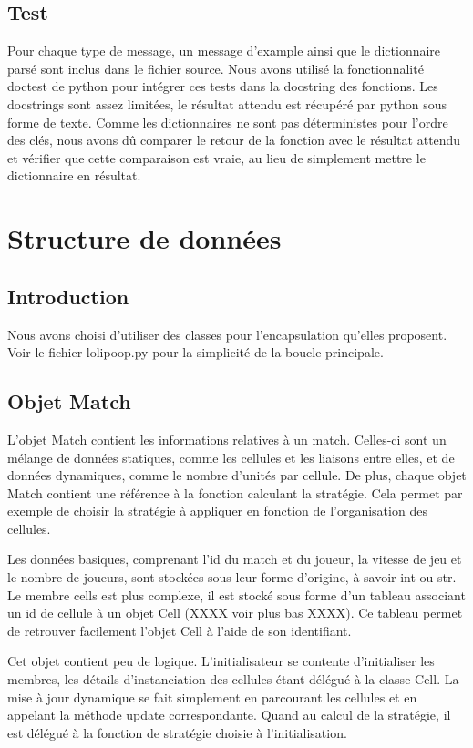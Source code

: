\documentclass{rapport}
\begin{document}
			\subsection{Test}
Pour chaque type de message, un message d'example ainsi que le dictionnaire
parsé sont inclus dans le fichier source. Nous avons utilisé la fonctionnalité
doctest de python pour intégrer ces tests dans la docstring des fonctions. Les
docstrings sont assez limitées, le résultat attendu est récupéré par python sous
forme de texte. Comme les dictionnaires ne sont pas déterministes pour l'ordre
des clés, nous avons dû comparer le retour de la fonction avec le résultat
attendu et vérifier que cette comparaison est vraie, au lieu de simplement
mettre le dictionnaire en résultat.

		\section{Structure de données}
			\subsection{Introduction}
Nous avons choisi d'utiliser des classes pour l'encapsulation qu'elles
proposent. Voir le fichier lolipoop.py pour la simplicité de la boucle
principale.
			\subsection{Objet Match}
L'objet Match contient les informations relatives à un match. Celles-ci sont un
mélange de données statiques, comme les cellules et les liaisons entre elles, et
de données dynamiques, comme le nombre d'unités par cellule. De plus, chaque
objet Match contient une référence à la fonction calculant la stratégie. Cela
permet par exemple de choisir la stratégie à appliquer en fonction de
l'organisation des cellules.

Les données basiques, comprenant l'id du match et du joueur, la vitesse de jeu
et le nombre de joueurs, sont stockées sous leur forme d'origine, à savoir int
ou str. Le membre cells est plus complexe, il est stocké sous forme d'un tableau
associant un id de cellule à un objet Cell (XXXX voir plus bas XXXX). Ce tableau
permet de retrouver facilement l'objet Cell à l'aide de son identifiant.

Cet objet contient peu de logique. L'initialisateur se contente d'initialiser
les membres, les détails d'instanciation des cellules étant délégué à la classe
Cell. La mise à jour dynamique se fait simplement en parcourant les cellules et
en appelant la méthode update correspondante. Quand au calcul de la stratégie,
il est délégué à la fonction de stratégie choisie à l'initialisation.
\end{document}
